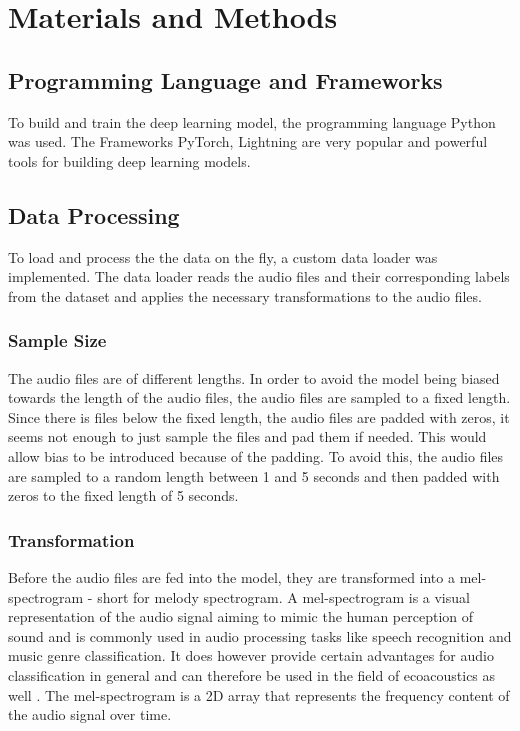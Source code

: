

\section{Materials and Methods}
\label{section2}

\subsection{Programming Language and Frameworks}
To build and train the deep learning model, the programming language Python was used.
The Frameworks PyTorch, Lightning are very popular and powerful tools for building deep learning models.

\subsection{Data Processing}
To load and process the the data on the fly, a custom data loader was implemented. 
The data loader reads the audio files and their corresponding labels from the dataset 
and applies the necessary transformations to the audio files.

\subsubsection{Sample Size}
The audio files are of different lengths. In order to avoid the model being biased towards 
the length of the audio files, the audio files are sampled to a fixed length. Since there is
files below the fixed length, the audio files are padded with zeros, it seems not enough to 
just sample the files and pad them if needed. This would allow bias to be introduced because
of the padding. To avoid this, the audio files are sampled to a random length between 1 and 5
seconds and then padded with zeros to the fixed length of 5 seconds.

\subsubsection{Transformation}
Before the audio files are fed into the model, they are transformed into a mel-spectrogram -
short for melody spectrogram. A mel-spectrogram is a visual representation of the audio signal 
aiming to mimic the human perception of sound and is commonly used in audio processing tasks like
speech recognition and music genre classification. It does however provide certain advantages
for audio classification in general and can therefore be used in the field of ecoacoustics as well \autocite[7]{stowellComputationalBioacousticsDeep2022}.
The mel-spectrogram is a 2D array that represents the frequency content of the audio signal over time.




